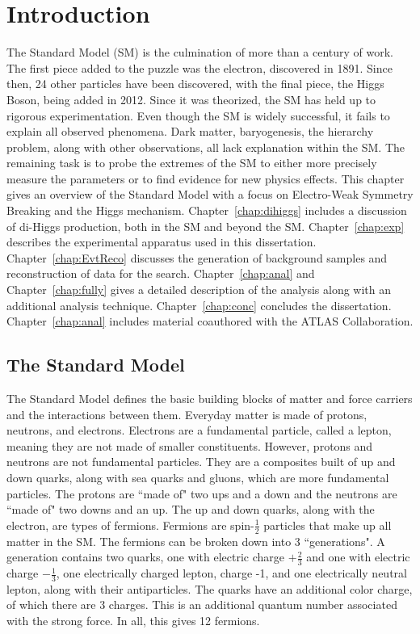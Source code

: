 \chapter{Introduction}
\label{chap:intro}
The Standard Model (SM) is the culmination of more than a century of work. The first piece added to the puzzle was the electron, discovered in 1891. Since then, 24 other particles have been discovered, with the final piece, the Higgs Boson, being added in 2012. Since it was theorized, the SM has held up to rigorous experimentation. Even though the SM is widely successful, it fails to explain all observed phenomena. Dark matter, baryogenesis, the hierarchy problem, along with other observations, all lack explanation within the SM. The remaining task is to probe the extremes of the SM to either more precisely measure the parameters or to find evidence for new physics effects.\newline
\indent This chapter gives an overview of the Standard Model with a focus on Electro-Weak Symmetry Breaking and the Higgs mechanism. Chapter~\ref{chap:dihiggs} includes a discussion of di-Higgs production, both in the SM and beyond the SM. Chapter~\ref{chap:exp} describes the experimental apparatus used in this dissertation. Chapter~\ref{chap:EvtReco} discusses the generation of background samples and reconstruction of data for the search. Chapter~\ref{chap:anal} and Chapter~\ref{chap:fully} gives a detailed description of the analysis along with an additional analysis technique. Chapter~\ref{chap:conc} concludes the dissertation. Chapter~\ref{chap:anal} includes material coauthored with the ATLAS Collaboration.
\section{The Standard Model}
The Standard Model defines the basic building blocks of matter and force carriers and the interactions between them. Everyday matter is made of protons, neutrons, and electrons. Electrons are a fundamental particle, called a lepton, meaning they are not made of smaller constituents. However, protons and neutrons are not fundamental particles. They are a composites built of up and down quarks, along with sea quarks and gluons, which  are more fundamental particles. The protons are ``made of" two ups and a down and the neutrons are ``made of" two downs and an up. The up and down quarks, along with the electron, are types of fermions. \newline
\indent Fermions are spin-${\frac{1}{2}}$ particles that make up all matter in the SM. The fermions can be broken down into 3 ``generations". A generation contains two quarks, one with electric charge ${+\frac{2}{3}}$ and one with electric charge ${-\frac{1}{3}}$, one electrically charged lepton, charge -1, and one electrically neutral lepton, along with their antiparticles. The quarks have an additional color charge, of which there are 3 charges. This is an additional quantum number associated with the strong force. In all, this gives 12 fermions. \newline 

